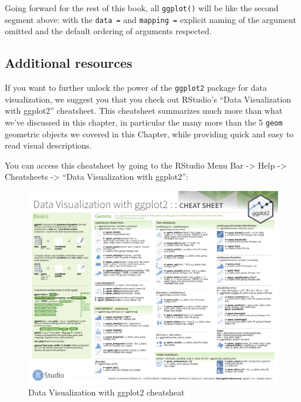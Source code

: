 \documentclass[
  letterpaper,
  DIV=11,
  numbers=noendperiod]{scrreprt}
\theoremstyle{definition}
\theoremstyle{remark}
\begin{document}
Going forward for the rest of this book, all \texttt{ggplot()} will be
like the second segment above: with the \texttt{data\ =} and
\texttt{mapping\ =} explicit naming of the argument omitted and the
default ordering of arguments respected.

\hypertarget{additional-resources-1}{%
\subsection{Additional resources}\label{additional-resources-1}}

If you want to further unlock the power of the \texttt{ggplot2} package
for data visualization, we suggest you that you check out RStudio's
``Data Visualization with ggplot2'' cheatsheet. This cheatsheet
summarizes much more than what we've discussed in this chapter, in
particular the many more than the 5 \texttt{geom} geometric objects we
covered in this Chapter, while providing quick and easy to read visual
descriptions.

You can access this cheatsheet by going to the RStudio Menu Bar
-\textgreater{} Help -\textgreater{} Cheatsheets -\textgreater{} ``Data
Visualization with ggplot2'':

\begin{figure}

{\centering \includegraphics{images/ggplot_cheatsheet-1.png}

}

\caption{\label{fig-ggplot-cheatsheet}Data Visualization with ggplot2
cheatsheat}

\end{figure}
\end{document}
